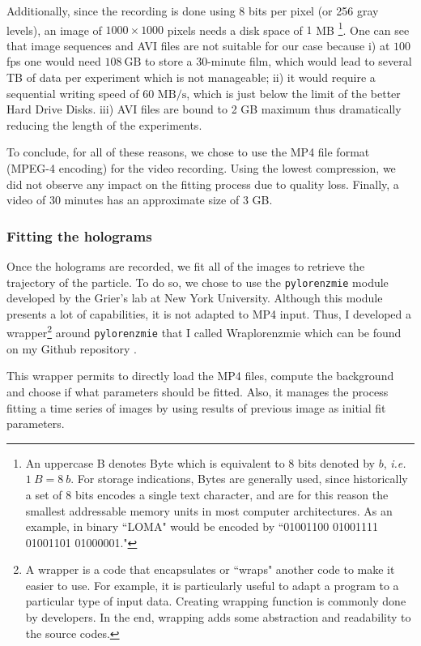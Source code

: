 Additionally, since the recording is done using 8 bits per pixel (or 256 gray levels), an image of $1000 \times 1000$ pixels needs a disk space of $1$ MB \footnote{An uppercase B denotes Byte which is equivalent to 8 bits denoted by $b$, \textit{i.e.} $1\mathrm ~ {B} = 8 ~ b$. For storage indications, Bytes are generally used, since historically a set of $8$ bits encodes a single text character, and are for this reason the smallest addressable memory units in most computer architectures. As an example, in binary ``LOMA" would be encoded by ``01001100 01001111 01001101 01000001."}. One can see that image sequences and AVI files are not suitable for our case because i) at $100$ \gls{fps} one would need $108 ~ \mathrm{GB}$ to store a 30-minute film, which would lead to several TB of data per experiment which is not manageable; ii) it would require a sequential writing speed of 60 $\mathrm{MB/s}$, which is just below the limit of the better Hard Drive Disks. iii) AVI files are bound to 2 GB maximum thus dramatically reducing the length of the experiments.

To conclude, for all of these reasons, we chose to use the MP4 file format (MPEG-4 encoding) for the video recording. Using the lowest compression, we did not observe any impact on the fitting process due to quality loss. Finally, a video of 30 minutes has an approximate size of 3 GB.


\subsubsection{Fitting the holograms}


Once the holograms are recorded, we fit all of the images to retrieve the trajectory of the particle. To do so, we chose to use the \texttt{pylorenzmie} module developed by the Grier's lab at New York University. Although this module presents a lot of capabilities, it is not adapted to MP4 input. Thus, I developed a wrapper\footnote{A wrapper is a code that encapsulates or ``wraps" another code to make it easier to use. For example, it is particularly useful to adapt a program to a particular type of input data. Creating wrapping function is commonly done by developers. In the end, wrapping adds some abstraction and readability to the source codes.} around \texttt{pylorenzmie} that I called Wraplorenzmie which can be found on my Github repository \href{https://github.com/eXpensia/wraplorenzmie}{\faGithub}. 

This wrapper permits to directly load the MP4 files, compute the background and choose if what parameters should be fitted. Also, it manages the process fitting a time series of images by using results of previous image as initial fit parameters.

